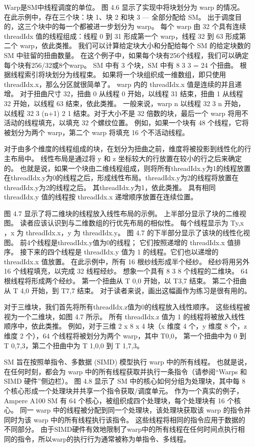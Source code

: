Warp是SM中线程调度的单位。 图 4.6 显示了实现中将块划分为 warp 的情况。 在此示例中，存在三个块：块 1、块 2 和块 3 — 全部分配给 SM。 出于调度目的，这三个块中的每一个都被进一步划分为 warp。 每个 warp 由 32 个具有连续 threadIdx 值的线程组成：线程 0 到 31 形成第一个 warp，线程 32 到 63 形成第二个 warp，依此类推。 我们可以计算给定块大小和分配给每个 SM 的给定块数的 SM 中驻留的扭曲数量。 在这个例子中，如果每个块有256个线程，我们可以确定每个块有256/32或8个warp。 SM 中有 3 个块，SM 中有 8 3 3 = 24 个扭曲。 根据线程索引将块划分为线程束。 如果将一个块组织成一维数组，即只使用threadIdx.x，那么分区就很简单了。 warp 内的 threadIdx.x 值是连续的并且递增。 对于扭曲尺寸 32，扭曲 0 从线程 0 开始，以线程 31 结束，扭曲 1 从线程 32 开始，以线程 63 结束，依此类推。 一般来说，warp n 以线程 32 3 n 开始，以线程 32 3 (n+1) 2 1 结束。对于大小不是 32 倍数的块，最后一个 warp 将用不活动的线程填充，以填充 32 个螺纹位置。 例如，如果一个块有 48 个线程，它将被划分为两个 warp，第二个 warp 将填充 16 个不活动线程。

对于由多个维度的线程组成的块，在划分为扭曲之前，维度将被投影到线性化的行主布局中。 线性布局是通过将 y 和 z 坐标较大的行放置在较小的行之后来确定的。 也就是说，如果一个块由二维线程组成，则将所有threadIdx.y为1的线程放置在threadIdx.y为0的线程之后，形成线性布局。threadIdx.y为2的线程将放置在threadIdx.y为2的线程之后。 其threadIdx.y为1，依此类推。 具有相同 threadIdx.y 值的线程按 threadIdx.x 递增顺序放置在连续位置。

图 4.7 显示了将二维块的线程放入线性布局的示例。 上半部分显示了块的二维视图。 读者应该认识到与二维数组的行优先布局的相似性。 每个线程显示为 Ty,x ，x 为 threadIdx.x，y 为 threadIdx.y。 图 4.7 的下半部分显示了该块的线性化视图。 前4个线程是threadIdx.y值为0的线程； 它们按照递增的 threadIdx.x 值排序。 接下来的四个线程是 threadIdx.y 值为 1 的线程。它们也以递增的 threadIdx.x 值放置。 在此示例中，所有 16 根纱线形成半个经纱。 经纱将用另外 16 个线程填充，以完成 32 线程经纱。 想象一个具有 8 3 8 个线程的二维块。 64 根线程将形成两个经纱。 第一个扭曲从 T 0,0 开始，以 T3,7 结束。 第二个扭曲从 T 4,0 开始，到 T7,7 结束。 对于读者来说，画出这幅画作为练习是很有用的。

对于三维块，我们首先将所有threadIdx.z值为0的线程放入线性顺序。 这些线程被视为一个二维块，如图 4.7 所示。 所有 threadIdx.z 值为 1 的线程将被放入线性顺序中，依此类推。 例如，对于三维 2 x 8 x 4 块（x 维度 4 个，y 维度 8 个，z 维度 2 个），64 个线程将被划分为两个 warp，其中 T0,0， 第一个扭曲中为 0 到 T 0,7,3，第二个扭曲中为 T 1,0,0 到 T 1,7,3。

SM 旨在按照单指令、多数据 (SIMD) 模型执行 warp 中的所有线程。 也就是说，在任何时刻，都会为 warp 中的所有线程获取并执行一条指令（请参阅“Warps 和 SIMD 硬件”侧边栏）。 图 4.8 显示了 SM 中的核心如何分组为处理块，其中每 8 个核心形成一个处理块并共享一个指令获取/调度单元。 作为一个真实的例子，Ampere A100 SM 有 64 个核心，被组织成四个处理块，每个处理块有 16 个核心。 同一 warp 中的线程被分配到同一个处理块，该处理块获取该 warp 的指令并同时为该 warp 中的所有线程执行该指令。 这些线程将相同的指令应用于数据的不同部分。 由于SIMD硬件有效地限制了warp中的所有线程在任何时间点执行相同的指令，所以warp的执行行为通常被称为单指令、多线程。

